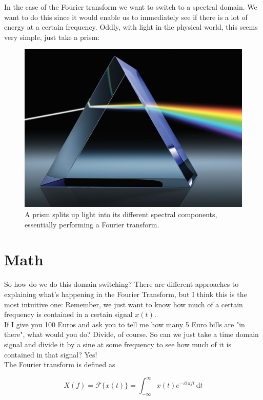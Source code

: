 In the case of the Fourier transform we want to switch to a spectral domain. We want to do this since it would enable us to immediately see if there is a lot of energy at a certain frequency. Oddly, with light in the physical world, this seems very simple, just take a prism:

\begin{figure}[H]
	\centering
	\includegraphics[width=\textwidth]{img/Prism.jpg}
	\caption[prism]
	{A prism splits up light into its different spectral components, essentially performing a Fourier transform.}
	\label{fig:prism}
\end{figure}

\section{Math}
So how do we do this domain switching? There are different approaches to explaining what's happening in the Fourier Transform, but I think this is the most intuitive one: Remember, we just want to know how much of a certain frequency is contained in a certain signal $x(t)$.\\
If I give you 100 Euros and ask you to tell me how many 5 Euro bills are "in there", what would you do? Divide, of course. So can we just take a time domain signal and divide it by a sine at some frequency to see how much of it is contained in that signal? Yes!\\
The Fourier transform is defined as

\begin{equation}
	X(f)= \mathcal{F} \{x(t)\} = \int_{-\infty}^\infty \! x(t) e^{-i2\pi ft} \, \mathrm{d}t
	\label{ft}
\end{equation}

